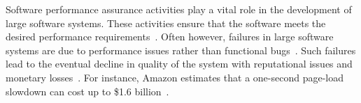 




Software performance assurance activities play a vital role in the development of large software systems. These activities ensure that the software meets the desired performance requirements~\cite{futureofspe}. Often however, failures in large software systems are due to performance issues rather than functional bugs~\cite{tailatscale, foo2010mining}. Such failures lead to the eventual decline in quality of the system with reputational issues and monetary losses~\cite{costofdowntime}. For instance, Amazon estimates that a one-second page-load slowdown can cost up to \$1.6 billion~\cite{amazononesec}. 

